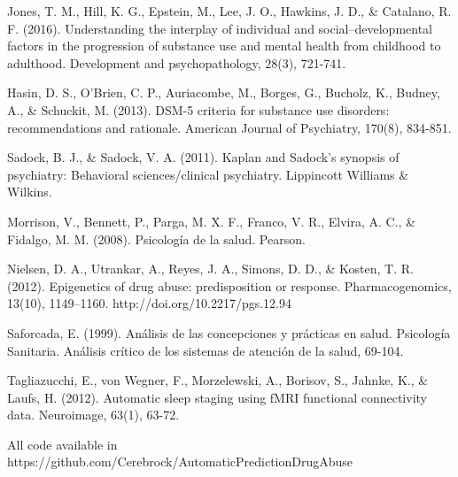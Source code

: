 \documentclass[8pt]{article}
\newenvironment{hangingpar}[1]
{\begin{list}
		{}
		{\setlength{\itemindent}{-#1}%
			\setlength{\leftmargin}{#1}%
			\setlength{\itemsep}{0pt}%
			\setlength{\parsep}{\parskip}%
			\setlength{\topsep}{\parskip}%
		}
		\setlength{\parindent}{-#1}%
		\item[]
	}
	{\end{list}}
\begin{document}
{\begin{hangingpar}{2em}
Jones, T. M., Hill, K. G., Epstein, M., Lee, J. O., Hawkins, J. D., \& Catalano, R. F. (2016). Understanding the interplay of individual and social–developmental factors in the progression of substance use and mental health from childhood to adulthood. Development and psychopathology, 28(3), 721-741.

Hasin, D. S., O’Brien, C. P., Auriacombe, M., Borges, G., Bucholz, K., Budney, A., \& Schuckit, M. (2013). DSM-5 criteria for substance use disorders: recommendations and rationale. American Journal of Psychiatry, 170(8), 834-851.

Sadock, B. J., \& Sadock, V. A. (2011). Kaplan and Sadock's synopsis of psychiatry: Behavioral sciences/clinical psychiatry. Lippincott Williams \& Wilkins.

Morrison, V., Bennett, P., Parga, M. X. F., Franco, V. R., Elvira, A. C., \& Fidalgo, M. M. (2008). Psicología de la salud. Pearson.

Nielsen, D. A., Utrankar, A., Reyes, J. A., Simons, D. D., \& Kosten, T. R. (2012). Epigenetics of drug abuse: predisposition or response. Pharmacogenomics, 13(10), 1149–1160. http://doi.org/10.2217/pgs.12.94

Saforcada, E. (1999). Análisis de las concepciones y prácticas en salud. Psicología Sanitaria. Análisis crítico de los sistemas de atención de la salud, 69-104.

Tagliazucchi, E., von Wegner, F., Morzelewski, A., Borisov, S., Jahnke, K., \& Laufs, H. (2012). Automatic sleep staging using fMRI functional connectivity data. Neuroimage, 63(1), 63-72.

All code available in https://github.com/Cerebrock/AutomaticPredictionDrugAbuse

\end{hangingpar}
\end{document}
